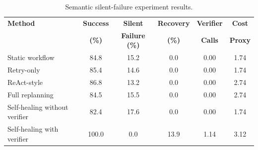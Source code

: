 \begin{table}[H]
\centering
\caption{Semantic silent-failure experiment results.}
\label{tab:semantic_silent_failure}
\footnotesize
\setlength{\tabcolsep}{4.5pt}
\begin{tabularx}{\textwidth}{L{0.34\textwidth} c c c c c}
\toprule
\textbf{Method} 
& \textbf{Success} 
& \textbf{Silent} 
& \textbf{Recovery} 
& \textbf{Verifier} 
& \textbf{Cost} \\
& \textbf{(\%)} 
& \textbf{Failure (\%)} 
& \textbf{(\%)} 
& \textbf{Calls} 
& \textbf{Proxy} \\
\midrule
Static workflow & 84.8 & 15.2 & 0.0 & 0.00 & 1.74 \\
Retry-only & 85.4 & 14.6 & 0.0 & 0.00 & 1.74 \\
ReAct-style & 86.8 & 13.2 & 0.0 & 0.00 & 2.74 \\
Full replanning & 84.5 & 15.5 & 0.0 & 0.00 & 2.74 \\
Self-healing without verifier & 82.4 & 17.6 & 0.0 & 0.00 & 1.74 \\
Self-healing with verifier & 100.0 & 0.0 & 13.9 & 1.14 & 3.12 \\
\bottomrule
\end{tabularx}
\end{table}
